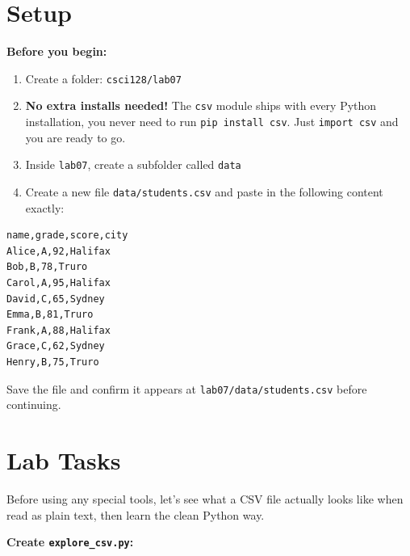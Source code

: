 \documentclass{cslab}
\begin{document}
\section{Setup}

\begin{setup}
\textbf{Before you begin:}
\begin{enumerate}
    \item Create a folder: \texttt{csci128/lab07}
    \item \textbf{No extra installs needed!} The \texttt{csv} module ships with every Python installation, you never need to run \texttt{pip install csv}. Just \texttt{import csv} and you are ready to go.
    \item Inside \texttt{lab07}, create a subfolder called \texttt{data}
    \item Create a new file \texttt{data/students.csv} and paste in the following content exactly:
\end{enumerate}

\begin{lstlisting}[language={},numbers=none,frame=single]
name,grade,score,city
Alice,A,92,Halifax
Bob,B,78,Truro
Carol,A,95,Halifax
David,C,65,Sydney
Emma,B,81,Truro
Frank,A,88,Halifax
Grace,C,62,Sydney
Henry,B,75,Truro
\end{lstlisting}

Save the file and confirm it appears at \texttt{lab07/data/students.csv} before continuing.
\end{setup}

\section{Lab Tasks}


Before using any special tools, let's see what a CSV file actually looks like when read as plain text, then learn the clean Python way.

\textbf{Create \texttt{explore\_csv.py}:}
\end{document}
